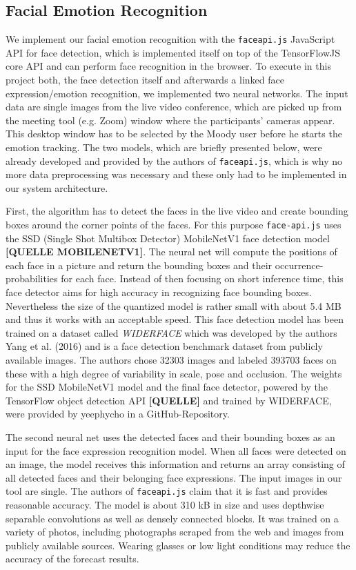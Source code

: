 \subsection{Facial Emotion Recognition}
\label{subsec:method_facial_emotion_recognition}
We implement our facial emotion recognition with the \texttt{faceapi.js} JavaScript API for face detection, which is implemented itself on top of the TensorFlowJS core API and can perform face recognition in the browser. To execute in this project both, the face detection itself and afterwards a linked face expression/emotion recognition, we implemented two neural networks. The input data are single images from the live video conference, which are picked up from the meeting tool (e.g. Zoom) window where the participants’ cameras appear. This desktop window has to be selected by the Moody user before he starts the emotion tracking. The two models, which are briefly presented below, were already developed and provided by the authors of \texttt{faceapi.js}, which is why no more data preprocessing was necessary and these only had to be implemented in our system architecture.

First, the algorithm has to detect the faces in the live video and create bounding boxes around the corner points of the faces. For this purpose \texttt{face-api.js} uses the SSD (Single Shot Multibox Detector) MobileNetV1 face detection model \textbf{[QUELLE MOBILENETV1]}. The neural net will compute the positions of each face in a picture and return the bounding boxes and their occurrence-probabilities for each face. Instead of then focusing on short inference time, this face detector aims for high accuracy in recognizing face bounding boxes. Nevertheless the size of the quantized model is rather small with about 5.4 MB and thus it works with an acceptable speed. This face detection model has been trained on a dataset called 
\emph{WIDERFACE} which was developed by the authors Yang et al. (2016) and is a face detection benchmark dataset from publicly available images. The authors chose 32303 images and labeled 393703 faces on these with a high degree of variability in scale, pose and occlusion. The weights for the SSD MobileNetV1 model and the final face detector, powered by the TensorFlow object detection API \textbf{[QUELLE]} and trained by WIDERFACE, were provided by yeephycho in a GitHub-Repository.

The second neural net uses the detected faces and their bounding boxes as an input for the face expression recognition model. When all faces were detected on an image, the model receives this information and returns an array consisting of all detected faces and their belonging face expressions. The input images in our tool are single. The authors of \texttt{faceapi.js} claim that it is fast and provides reasonable accuracy. The model is about 310 kB in size and uses depthwise separable convolutions as well as densely connected blocks. It was trained on a variety of photos, including photographs scraped from the web and images from publicly available sources. Wearing glasses or low light conditions may reduce the accuracy of the forecast results.


